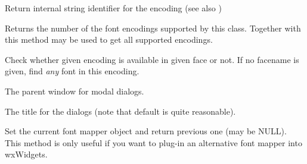 \label{wxfontmappergetencodingname}


Return internal string identifier for the encoding (see also 
)




\label{wxfontmappergetsupportedencodingscount}


Returns the number of the font encodings supported by this class. Together with 
 this method may be used to get
all supported encodings.


\label{wxfontmapperisencodingavailable}


Check whether given encoding is available in given face or not.
If no facename is given, find {\it any} font in this encoding.


\label{wxfontmappersetdialogparent}


The parent window for modal dialogs.


\label{wxfontmappersetdialogtitle}


The title for the dialogs (note that default is quite reasonable).


\label{wxfontmapperset}


Set the current font mapper object and return previous one (may be NULL).
This method is only useful if you want to plug-in an alternative font mapper
into wxWidgets.



